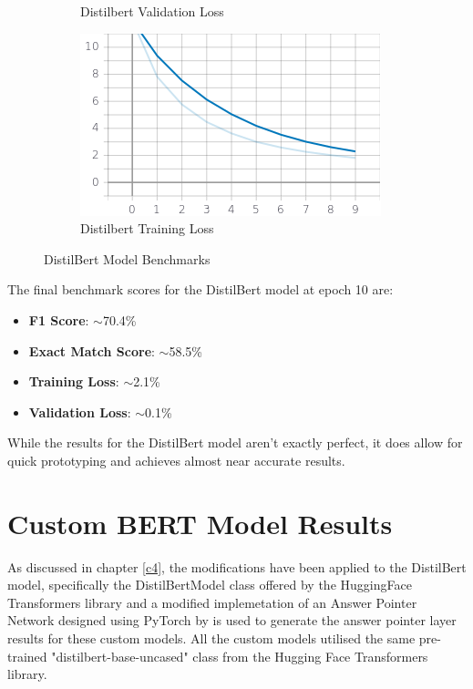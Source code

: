 \documentclass[a4paper,12pt]{report}
\begin{document}
\begin{figure}
\begin{subfigure}[b]{0.4\textwidth}
		\caption{\small Distilbert Validation Loss}    
		\label{distilbertValLoss}
	\end{subfigure}
	\hfill
	\begin{subfigure}[b]{0.4\textwidth}
		\centering 
		\includegraphics[width=\textwidth]{../images/Distilbert_Train_Loss.png}
		\caption{\small Distilbert Training Loss}  
		\label{distilbertTrainloss}
	\end{subfigure}
	\caption{DistilBert Model Benchmarks} 
	\label{distilbertBenchmarks}
\end{figure}

	The final benchmark scores for the DistilBert model at epoch 10 are:
\begin{itemize}
	\item \textbf{F1 Score}:  $\sim$70.4\%
	\item \textbf{Exact Match Score}: $\sim$58.5\%
	\item \textbf{Training Loss}:  $\sim$2.1\%
	\item \textbf{Validation Loss}: $\sim$0.1\%
\end{itemize}

While the results for the DistilBert model aren't exactly perfect, it does allow for quick prototyping and achieves almost near accurate results. 


\section{Custom BERT Model Results}\label{c52}

	As discussed in chapter \ref{c4}, the modifications have been applied to the DistilBert model, specifically the DistilBertModel class offered by the HuggingFace Transformers library \citep{hfTransformers} and a modified implemetation of an Answer Pointer Network designed using PyTorch by \citep{pointernetGit} is used to generate the answer pointer layer results for these custom models. All the custom models utilised the same pre-trained "distilbert-base-uncased" class from the Hugging Face Transformers library.	
	
\end{document}
